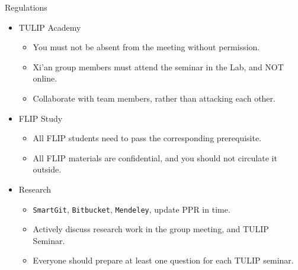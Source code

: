 \documentclass[
 size=14pt,
 paper=smartboard,  %
 mode=present, 		%
 display=slides, 	%
 pauseslide,
 fleqn,leqno]{powerdot}{}
\begin{document}
\begin{slide}{Regulations}

\begin{center}
\begin{itemize}

\item<1->
{TULIP Academy}

\begin{itemize}
\item
You must not be absent from the meeting without permission.

\item
Xi'an group members must attend the seminar in the Lab,
and NOT online.

\item
Collaborate with team members, rather than attacking each other.
\end{itemize}

\item<2->
{FLIP Study}

\begin{itemize}
\item
All FLIP students need to pass the corresponding prerequisite.

\item
All FLIP materials are confidential, and you should not circulate it outside.
\end{itemize}

\item<3->
{Research}

\begin{itemize}
\item
\texttt{SmartGit}, \texttt{Bitbucket}, \texttt{Mendeley},
update PPR in time.

\item
Actively discuss research work in the group meeting, and TULIP Seminar.

\item
Everyone should prepare at least one question for each TULIP seminar.
\end{itemize}
\end{itemize}
\end{center}

\end{slide}
\end{document}
